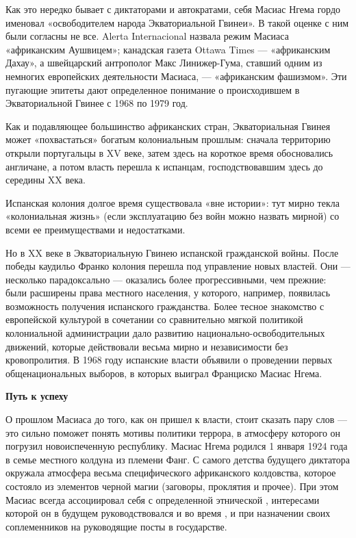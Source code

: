 Как это нередко бывает с диктаторами и автократами, себя Масиас Нгема гордо именовал «освободителем народа Экваториальной Гвинеи». В такой оценке с ним были согласны не все.  Alerta Internacional назвала режим Масиаса «африканским Аушвицем»; канадская газета Ottawa Times --- «африканским Дахау», а швейцарский антрополог Макс Линижер-Гума, ставший одним из немногих европейских  деятельности Масиаса, --- «африканским фашизмом». Эти пугающие эпитеты дают определенное понимание о происходившем в Экваториальной Гвинее с 1968 по 1979 год.

Как и подавляющее большинство африканских стран, Экваториальная Гвинея может «похвастаться» богатым колониальным прошлым: сначала территорию открыли португальцы в XV веке, затем здесь на короткое время обосновались англичане, а потом власть перешла к испанцам, господствовавшим здесь до середины XX века.

\begin{fancyquotes}
    Испанская колония долгое время существовала «вне истории»: тут мирно текла «колониальная жизнь» (если эксплуатацию без войн можно назвать мирной) со всеми ее преимуществами и недостатками.
\end{fancyquotes}

Но в XX веке в Экваториальную Гвинею   испанской гражданской войны. После победы каудильо Франко колония перешла под управление новых властей. Они --- несколько парадоксально --- оказались более прогрессивными, чем прежние: были расширены права местного населения, у которого, например, появилась возможность получения испанского гражданства. Более тесное знакомство с европейской культурой в сочетании со сравнительно мягкой политикой колониальной администрации дало  развитию национально-освободительных движений, которые действовали весьма мирно и  независимости без кровопролития. В 1968 году испанские власти объявили о проведении первых общенациональных выборов, в которых выиграл Франциско Масиас Нгема.


\textbf{Путь к успеху}

О прошлом Масиаса до того, как он пришел к власти, стоит сказать пару слов --- это сильно поможет понять мотивы политики террора, в атмосферу которого он погрузил новоиспеченную республику. Масиас Нгема родился 1 января 1924 года в семье местного колдуна из племени Фанг. С самого детства будущего диктатора окружала атмосфера весьма специфического африканского колдовства, которое  состояло из элементов черной магии (заговоры, проклятия и прочее). При этом Масиас всегда ассоциировал себя с определенной этнической , интересами которой он в будущем руководствовался и во время , и при назначении своих соплеменников на руководящие посты в государстве.

